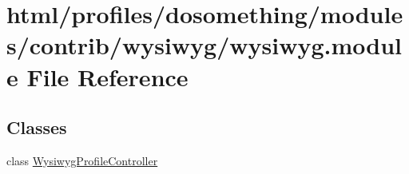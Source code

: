 \hypertarget{wysiwyg_8module}{
\section{html/profiles/dosomething/modules/contrib/wysiwyg/wysiwyg.module File Reference}
\label{wysiwyg_8module}
}
\subsection*{Classes}
\begin{DoxyCompactItemize}
\item 
class \hyperlink{classWysiwygProfileController}{WysiwygProfileController}
\end{DoxyCompactItemize}
